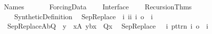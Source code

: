 %
\begin{isabellebody}%
%
%
\isadelimdocument
%
\endisadelimdocument
%
\isatagdocument
%
\isamarkuptrue%
%
\endisatagdocument
{\isafolddocument}%
%
\isadelimdocument
%
\endisadelimdocument
%
\isadelimtheory
%
\endisadelimtheory
%
\isatagtheory
{}\isamarkupfalse%
\ Names\isanewline
\ \ \isanewline
\ \ \ \ Forcing{\isacharunderscore}{\kern0pt}Data\isanewline
\ \ \ \ Interface\isanewline
\ \ \ \ Recursion{\isacharunderscore}{\kern0pt}Thms\isanewline
\ \ \ \ Synthetic{\isacharunderscore}{\kern0pt}Definition\isanewline
{}%
\endisatagtheory
{\isafoldtheory}%
%
\isadelimtheory
\isanewline
%
\endisadelimtheory
\isanewline
{}\isamarkupfalse%
\isanewline
\ \ SepReplace\ {\isacharcolon}{\kern0pt}{\isacharcolon}{\kern0pt}\ {\isachardoublequoteopen}{\isacharbrackleft}{\kern0pt}i{\isacharcomma}{\kern0pt}\ i{\isasymRightarrow}i{\isacharcomma}{\kern0pt}\ i{\isasymRightarrow}\ o{\isacharbrackright}{\kern0pt}\ {\isasymRightarrow}\ i{\isachardoublequoteclose}\ \isanewline
\ \ {\isachardoublequoteopen}SepReplace{\isacharparenleft}{\kern0pt}A{\isacharcomma}{\kern0pt}b{\isacharcomma}{\kern0pt}Q{\isacharparenright}{\kern0pt}\ {\isasymequiv}\ {\isacharbraceleft}{\kern0pt}y\ {\isachardot}{\kern0pt}\ x{\isasymin}A{\isacharcomma}{\kern0pt}\ y{\isacharequal}{\kern0pt}b{\isacharparenleft}{\kern0pt}x{\isacharparenright}{\kern0pt}\ {\isasymand}\ Q{\isacharparenleft}{\kern0pt}x{\isacharparenright}{\kern0pt}{\isacharbraceright}{\kern0pt}{\isachardoublequoteclose}\isanewline
\isanewline
{}\isamarkupfalse%
\isanewline
\ \ {\isachardoublequoteopen}{\isacharunderscore}{\kern0pt}SepReplace{\isachardoublequoteclose}\ \ {\isacharcolon}{\kern0pt}{\isacharcolon}{\kern0pt}\ {\isachardoublequoteopen}{\isacharbrackleft}{\kern0pt}i{\isacharcomma}{\kern0pt}\ pttrn{\isacharcomma}{\kern0pt}\ i{\isacharcomma}{\kern0pt}\ o{\isacharbrackright}{\kern0pt}\ {\isasymRightarrow}\ i{\isachardoublequoteclose}\ \ {\isacharparenleft}{\kern0pt}{\isachardoublequoteopen}{\isacharparenleft}{\kern0pt}{}{\isacharbraceleft}{\kern0pt}{\isacharunderscore}{\kern0pt}\ {\isachardot}{\kern0pt}{\isachardot}{\kern0pt}{\isacharslash}{\kern0pt}\ {\isacharunderscore}{\kern0pt}\ {\isasymin}\ {\isacharunderscore}{\kern0pt}{\isacharcomma}{\kern0pt}\ {\isacharunderscore}{\kern0pt}{\isacharbraceright}{\kern0pt}{\isacharparenright}{\kern0pt}{\isachardoublequoteclose}{\isacharparenright}{\kern0pt}\isanewline

\end{isabellebody}
